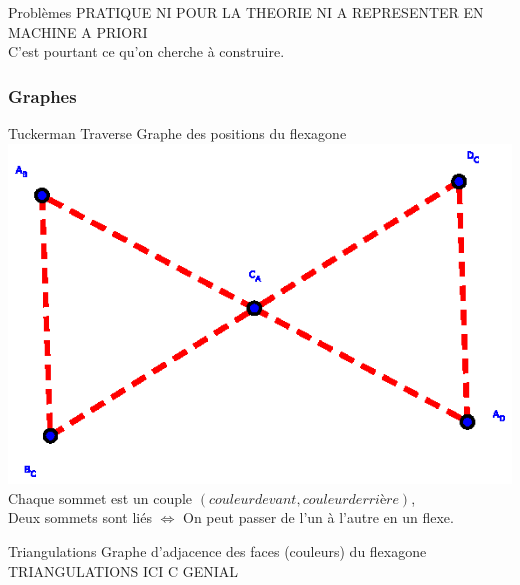 \documentclass[french,xcolor=dvipsnames]{beamer}
\begin{document}
		\begin{frame}{Problèmes}
			PRATIQUE NI POUR LA THEORIE NI A REPRESENTER EN MACHINE A PRIORI\\
			C'est pourtant ce qu'on cherche à construire.
		\end{frame}
				
		\subsubsection{Graphes}
		\begin{frame}{Tuckerman Traverse}
			Graphe des positions du flexagone
			\includegraphics[scale=0.6]{TT_graphe_4.eps}\\
			Chaque sommet est un couple $(couleur devant, couleur derrière)$,\\
			Deux sommets sont liés $\Leftrightarrow$ On peut passer de l'un à l'autre en un flexe.
		\end{frame}		
		
		\begin{frame}{Triangulations}
			Graphe d'adjacence des faces (couleurs) du flexagone
			TRIANGULATIONS ICI C GENIAL		
		\end{frame}
		
\end{document}
